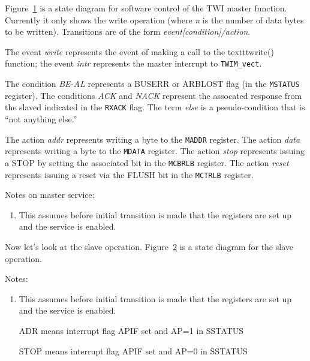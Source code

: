 \documentclass{article}
\begin{document}
\begin{figure}[h]\label{fig:1}
  \centering
  
\end{figure}
\vskip 1pc

Figure~\ref{fig:1} is a state diagram for software control of the TWI
master function. Currently it only shows the write operation (where
\textit{n} is the number of data bytes to be written).
Transitions are of the form \textit{event[condition]/action}.

The event \textit{write} represents the event of making a call to the
texttt{write()} function; the event \textit{intr} represents the
master interrupt to \texttt{TWIM\_vect}.

The condition \textit{BE-AL} represents a BUSERR or ARBLOST flag (in
the \texttt{MSTATUS} register).  The conditions \textit{ACK} and
\textit{NACK} represent the assocated response from the slaved
indicated in the \texttt{RXACK} flag.  The term \textit{else} is a
pseudo-condition that is ``not anything else.''

The action \textit{addr} represents writing a byte to the
\texttt{MADDR} register.  The action \textit{data} represents writing a
byte to the \texttt{MDATA} register.  The action \textit{stop}
represents issuing a STOP by setting the associated bit in the
\texttt{MCBRLB} register.  The action \textit{reset} represents
issuing a reset via the FLUSH bit in the \texttt{MCTRLB} register.

Notes on master service:
\begin{enumerate}
\item
This assumes before initial transition is made that the registers are
set up and the service is enabled.
\end{enumerate}

\vskip 1pc

Now let's look at the slave operation.  Figure~\ref{fig:2} is a state
diagram for the slave operation.

\begin{figure}[h]\label{fig:2}
  \centering
  
\end{figure}

Notes:
\begin{enumerate}
\item
This assumes before initial transition is made that the registers are
set up and the service is enabled.
\item
[ADR] means interrupt flag APIF set and AP=1 in SSTATUS
\item
[STOP] means interrupt flag APIF set and AP=0 in SSTATUS
\end{enumerate}
\end{document}
